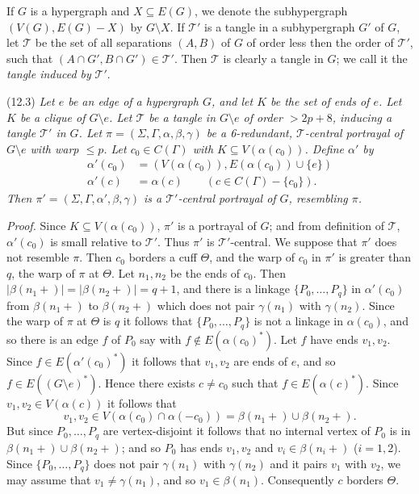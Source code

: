 If $G$ is a hypergraph and $X \subseteq E(G)$, we denote the subhypergraph $(V(G), E(G) - X)$ by $G \setminus X$. If $\mathscr{T}'$ is a tangle in a subhypergraph $G'$ of $G$, let $\mathscr{T}$ be the set of all separations $(A, B)$ of $G$ of order less then the order of $\mathscr{T}'$, such that $(A \cap G', B \cap G') \in \mathscr{T}'$. Then $\mathscr{T}$ is clearly a tangle in $G$; we call it the \textit{tangle induced by} $\mathscr{T}'$.

\stmt
(12.3) \textit{Let $e$ be an edge of a hypergraph $G$, and let $K$ be the set of ends of $e$. Let $K$ be a clique of $G \setminus e$. Let $\mathscr{T}$ be a tangle in $G \setminus e$ of order $> 2p+8$, inducing a tangle $\mathscr{T}'$ in $G$. Let $\pi = (\Sigma, \Gamma, \alpha, \beta, \gamma)$ be a 6-redundant, $\mathscr{T}$-central portrayal of $G \setminus e$ with warp $\le p$. Let $c_0 \in C(\Gamma)$ with $K \subseteq V(\alpha(c_0))$. Define $\alpha'$ by}
\begin{align*}
\alpha'(c_0) &= (V(\alpha(c_0)), E(\alpha(c_0)) \cup \{e\}) \\
\alpha'(c) &= \alpha(c) \qquad (c \in C(\Gamma) - \{c_0\}).
\end{align*}
\textit{Then $\pi' = (\Sigma, \Gamma, \alpha', \beta, \gamma)$ is a $\mathscr{T}'$-central portrayal of $G$, resembling $\pi$.}

\textit{Proof.} Since $K \subseteq V(\alpha(c_0))$, $\pi'$ is a portrayal of $G$; and from definition of $\mathscr{T}$, $\alpha'(c_0)$ is small relative to $\mathscr{T}'$. Thus $\pi'$ is $\mathscr{T}'$-central. We suppose that $\pi'$ does not resemble $\pi$. Then $c_0$ borders a cuff $\Theta$, and the warp of $c_0$ in $\pi'$ is greater than $q$, the warp of $\pi$ at $\Theta$. Let $n_1, n_2$ be the ends of $c_0$. Then $|\beta(n_1 +)| = |\beta(n_2 +)| = q + 1$, and there is a linkage $\{P_0, \dots, P_q\}$ in $\alpha'(c_0)$ from $\beta(n_1 +)$ to $\beta(n_2 +)$ which does not pair $\gamma(n_1)$ with $\gamma(n_2)$. Since the warp of $\pi$ at $\Theta$ is $q$ it follows that $\{P_0, \dots, P_q\}$ is not a linkage in $\alpha(c_0)$, and so there is an edge $f$ of $P_0$ say with $f \notin E(\alpha(c_0)^*)$. Let $f$ have ends $v_1, v_2$. Since $f \in E(\alpha'(c_0)^*)$ it follows that $v_1, v_2$ are ends of $e$, and so $f \in E((G \setminus e)^*)$. Hence there exists $c \ne c_0$ such that $f \in E(\alpha(c)^*)$. Since $v_1, v_2 \in V(\alpha(c))$ it follows that
\begin{equation*}
v_1, v_2 \in V(\alpha(c_0) \cap \alpha(-c_0)) = \beta(n_1 +) \cup \beta(n_2 +).
\end{equation*}
But since $P_0, \dots, P_q$ are vertex-disjoint it follows that no internal vertex of $P_0$ is in $\beta(n_1 +) \cup \beta(n_2 +)$; and so $P_0$ has ends $v_1, v_2$ and $v_i \in \beta(n_i +)$ ($i = 1, 2$). Since $\{P_0, \dots, P_q\}$ does not pair $\gamma(n_1)$ with $\gamma(n_2)$ and it pairs $v_1$ with $v_2$, we may assume that $v_1 \ne \gamma(n_1)$, and so $v_1 \in \beta(n_1)$. Consequently $c$ borders $\Theta$.

